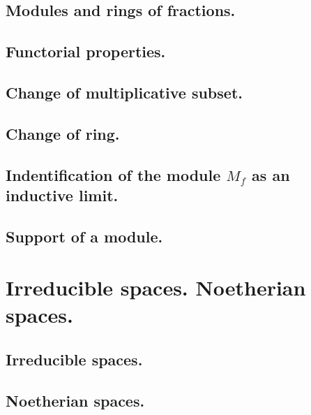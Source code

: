 \documentclass[10pt,oneside]{amsart}
\begin{document}
        \subsection{Modules and rings of fractions.}
        

        \subsection{Functorial properties.}
        

        \subsection{Change of multiplicative subset.}
        

        \subsection{Change of ring.}
        

        \subsection{Indentification of the module $M_f$ as an inductive limit.}
        

        \subsection{Support of a module.}
        

    \section{Irreducible spaces. Noetherian spaces.}

        \subsection{Irreducible spaces.}
        

        \subsection{Noetherian spaces.}
        

\clearpage
\end{document}
